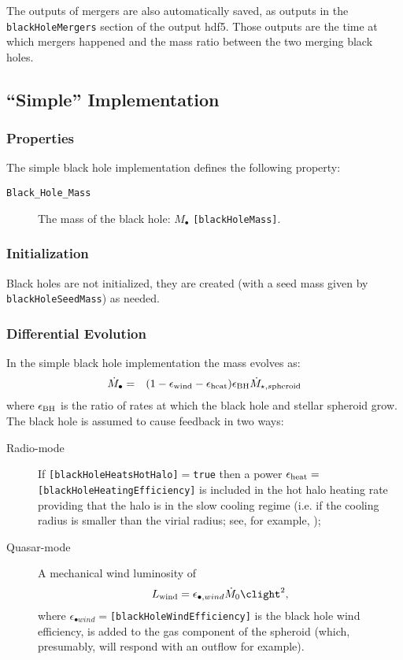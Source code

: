 The outputs of mergers are also automatically saved, as outputs in the {\tt blackHoleMergers} section of the output hdf5. Those outputs are the time at which mergers happened and the mass ratio between  the two merging black holes.


\subsection{``Simple'' Implementation}

\subsubsection{Properties}

The simple black hole implementation defines the following property:
\begin{description}
 \item [{\tt Black\_Hole\_Mass}] The mass of the black hole: $M_\bullet$ {\tt [blackHoleMass]}.
\end{description}

\subsubsection{Initialization}

Black holes are not initialized, they are created (with a seed mass given by {\tt blackHoleSeedMass}) as needed.

\subsubsection{Differential Evolution}

In the simple black hole implementation the mass evolves as:
\begin{eqnarray}
\dot{M}_\bullet &=& (1-\epsilon_{\rm wind}-\epsilon_{\rm heat}) \epsilon_{\rm BH} \dot{M}_{\star,s{\rm pheroid}} \\
\end{eqnarray}
where $\epsilon_{\rm BH}$ is the ratio of rates at which the black hole and stellar spheroid grow. The black hole is assumed to cause feedback in two ways:
\begin{description}
 \item [Radio-mode] If {\tt [blackHoleHeatsHotHalo]}$=${\tt true} then a power $\epsilon_{\rm heat}=${\tt [blackHoleHeatingEfficiency]} is included in the hot halo heating rate providing that the halo is in the slow cooling regime (i.e. if the cooling radius is smaller than the virial radius; see, for example, \citealt{benson_cold_2010});
 \item [Quasar-mode] A mechanical wind luminosity of \citep{ostriker_momentum_2010}
\begin{equation}
 L_{\rm wind} = \epsilon_{\bullet, wind} \dot{M}_0 \clight^2,
\end{equation}
where $\epsilon_{\bullet wind}=${\tt [blackHoleWindEfficiency]} is the black hole wind efficiency, is added to the gas component of the spheroid (which, presumably, will respond with an outflow for example).
\end{description}

